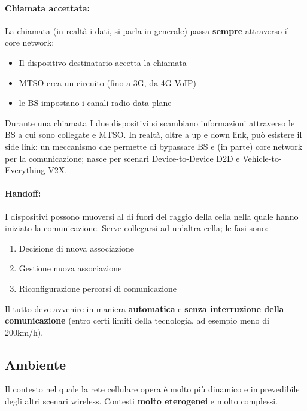 \paragraph{Chiamata accettata:} La chiamata (in realtà i dati, si parla in generale) passa \textbf{sempre} attraverso il core network:
\begin{itemize}
	\item Il dispositivo destinatario accetta la chiamata
	\item MTSO crea un circuito (fino a 3G, da 4G VoIP)
	\item le BS impostano i canali radio data plane
\end{itemize}

Durante una chiamata I due dispositivi si scambiano informazioni attraverso le BS a cui sono collegate e MTSO. In realtà, oltre a up e down link, può esistere il side link: un meccanismo che permette di bypassare BS e (in parte) core network per la comunicazione; nasce per scenari Device-to-Device D2D e Vehicle-to-Everything V2X.\\

\paragraph{Handoff:} I dispositivi possono muoversi al di fuori del raggio della cella nella quale hanno iniziato la comunicazione. Serve collegarsi ad un'altra cella; le fasi sono:
\begin{enumerate}
	\item Decisione di nuova associazione
	\item Gestione nuova associazione
	\item Riconfigurazione percorsi di comunicazione
\end{enumerate}

Il tutto deve avvenire in maniera \textbf{automatica} e \textbf{senza interruzione della comunicazione} (entro certi limiti della tecnologia, ad esempio meno di 200km/h).\\

\newpage

\subsection{Ambiente}

Il contesto nel quale la rete cellulare opera è molto più dinamico e imprevedibile degli altri scenari wireless. Contesti \textbf{molto eterogenei} e molto complessi. \\

